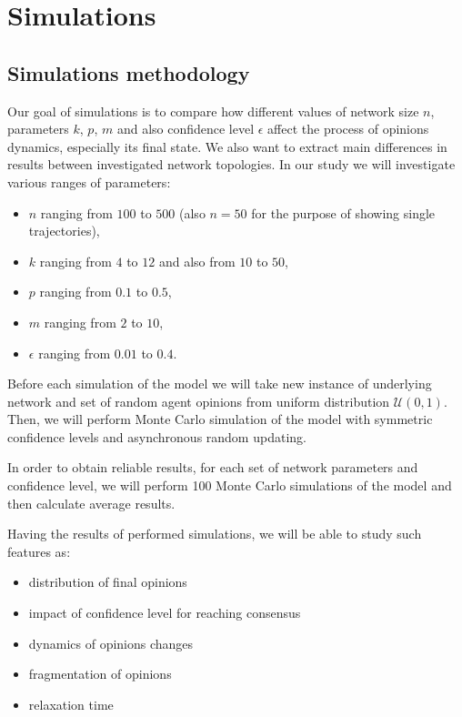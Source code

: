 \documentclass[a4paper, 12pt]{article}
\begin{document}
\section{Simulations}

\subsection{Simulations methodology}
Our goal of simulations is to compare how different values of network size $n$, parameters $k$, $p$, $m$ and also confidence level $\epsilon$ affect the process of opinions dynamics, especially its final state. We also want to extract main differences in results between investigated network topologies. In our study we will investigate various ranges of parameters:

\begin{itemize}
\item $n$ ranging from $100$ to $500$ (also $n=50$ for the purpose of showing single trajectories),
\item $k$ ranging from $4$ to $12$ and also from $10$ to $50$,
\item $p$ ranging from $0.1$ to $0.5$,
\item $m$ ranging from $2$ to $10$,
\item $\epsilon$ ranging from $0.01$ to $0.4$.
\end{itemize}

Before each simulation of the model we will take new instance of underlying network and set of random agent opinions from uniform distribution $\mathcal{U}(0, 1)$. Then, we will perform Monte Carlo simulation of the model with symmetric confidence levels and asynchronous random updating.
\indent

 In order to obtain reliable results, for each set of network parameters and confidence level, we will perform 100 Monte Carlo simulations of the model and then calculate average results.
\indent

Having the results of performed simulations, we will be able to study such features as:
\begin{itemize}
\item distribution of final opinions
\item impact of confidence level for reaching consensus
\item dynamics of opinions changes
\item fragmentation of opinions
\item relaxation time
\end{itemize}
\indent
\end{document}
